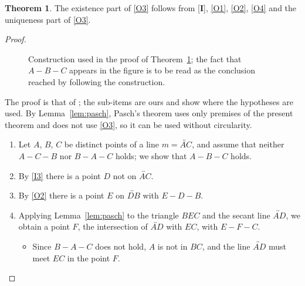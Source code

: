 \documentclass[11pt]{amsart}
\theoremstyle{definition}
\newtheorem{thm}{Theorem}[section]
\theoremstyle{remark}
\begin{document}
\begin{thm}\label{thm:ex}
The existence part of \ref{O3} follows from [\textbf{I}], \ref{O1}, \ref{O2}, \ref{O4} and the uniqueness part of \ref{O3}.
\end{thm}
\begin{proof}
\begin{figure}
\centering
{}
\caption{Construction used in the proof of Theorem~\ref{thm:ex}; the fact that $A-B-C$ appears in the figure is to be read as the conclusion reached by following the construction.}\label{fig:ex}
\end{figure}
The proof is that of \cite[Theorem~8]{BSV}; the sub-items are ours and show where the hypotheses are used. By Lemma~\ref{lem:pasch}, Pasch's theorem uses only premises of the present theorem and does not use \ref{O3}, so it can be used without circularity.
\begin{enumerate}[label=(\arabic*)]
\item Let $A$, $B$, $C$ be distinct points of a line $m=\overleftrightarrow{AC}$, and assume that neither $A-C-B$ nor $B-A-C$ holds; we show that $A-B-C$ holds.
\item By \ref{I3} there is a point $D$ not on $\overleftrightarrow{AC}$.
\item By \ref{O2} there is a point $E$ on $\overleftrightarrow{DB}$ with $E-D-B$.
\item Applying Lemma~\ref{lem:pasch} to the triangle $BEC$ and the secant line $\overleftrightarrow{AD}$, we obtain a point $F$, the intersection of $\overleftrightarrow{AD}$ with $EC$, with $E-F-C$.
\begin{itemize}
  \item Since $B-A-C$ does not hold, $A$ is not in $BC$, and the line $\overleftrightarrow{AD}$ must meet $EC$ in the point $F$.

\end{itemize}
\end{enumerate}
\end{proof}
\end{document}

